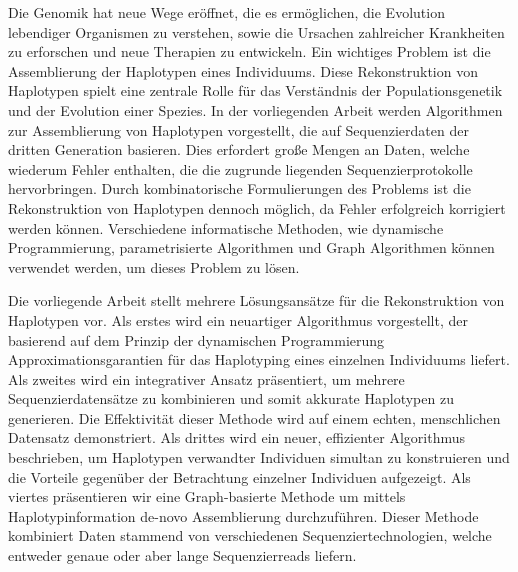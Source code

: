 Die Genomik hat neue Wege eröffnet, die es ermöglichen, die Evolution lebendiger Organismen zu verstehen, sowie die Ursachen zahlreicher Krankheiten zu erforschen und neue Therapien zu entwickeln.
Ein wichtiges Problem ist die Assemblierung der Haplotypen eines Individuums. Diese Rekonstruktion von Haplotypen spielt eine zentrale Rolle für das Verständnis der Populationsgenetik und der Evolution einer Spezies.
In der vorliegenden Arbeit werden Algorithmen zur Assemblierung von Haplotypen vorgestellt, die auf Sequenzierdaten der dritten Generation basieren. Dies erfordert große Mengen an Daten, welche wiederum Fehler enthalten,
die die zugrunde liegenden Sequenzierprotokolle hervorbringen. Durch kombinatorische Formulierungen des Problems ist die Rekonstruktion von Haplotypen dennoch möglich, da Fehler erfolgreich korrigiert werden können.
Verschiedene informatische Methoden, wie dynamische Programmierung, parametrisierte Algorithmen und Graph Algorithmen können verwendet werden, um dieses Problem zu lösen.

Die vorliegende Arbeit stellt mehrere Lösungsansätze für die Rekonstruktion von Haplotypen vor.
Als erstes wird ein neuartiger Algorithmus vorgestellt, der basierend auf dem Prinzip der dynamischen Programmierung Approximationsgarantien für das Haplotyping eines einzelnen Individuums
liefert.
Als zweites wird ein integrativer Ansatz präsentiert, um mehrere Sequenzierdatensätze zu kombinieren und somit akkurate Haplotypen zu generieren.
Die Effektivität dieser Methode wird auf einem echten, menschlichen Datensatz demonstriert.
Als drittes wird ein neuer, effizienter Algorithmus beschrieben, um Haplotypen verwandter Individuen simultan zu konstruieren und die Vorteile gegenüber der Betrachtung einzelner Individuen aufgezeigt.
Als viertes präsentieren wir eine Graph-basierte Methode um mittels Haplotypinformation de-novo Assemblierung durchzuführen. Dieser Methode kombiniert Daten stammend von verschiedenen Sequenziertechnologien, welche entweder
genaue oder aber lange Sequenzierreads liefern.


 


